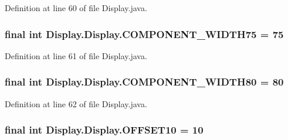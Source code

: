 Definition at line 60 of file Display.\+java.

\hypertarget{class_display_1_1_display_a357b313cc7372c3fce2808f738c26369}{}
\subsubsection[{C\+O\+M\+P\+O\+N\+E\+N\+T\+\_\+\+W\+I\+D\+T\+H75}]{\setlength{\rightskip}{0pt plus 5cm}final int Display.\+Display.\+C\+O\+M\+P\+O\+N\+E\+N\+T\+\_\+\+W\+I\+D\+T\+H75 = 75\hspace{0.3cm}{\ttfamily [static]}}\label{class_display_1_1_display_a357b313cc7372c3fce2808f738c26369}


Definition at line 61 of file Display.\+java.

\hypertarget{class_display_1_1_display_a42b05e8c9ef5a9a34a30dd19412e22e0}{}
\subsubsection[{C\+O\+M\+P\+O\+N\+E\+N\+T\+\_\+\+W\+I\+D\+T\+H80}]{\setlength{\rightskip}{0pt plus 5cm}final int Display.\+Display.\+C\+O\+M\+P\+O\+N\+E\+N\+T\+\_\+\+W\+I\+D\+T\+H80 = 80\hspace{0.3cm}{\ttfamily [static]}}\label{class_display_1_1_display_a42b05e8c9ef5a9a34a30dd19412e22e0}


Definition at line 62 of file Display.\+java.

\hypertarget{class_display_1_1_display_a43bf93ef0872de87948d181590683656}{}
\subsubsection[{O\+F\+F\+S\+E\+T10}]{\setlength{\rightskip}{0pt plus 5cm}final int Display.\+Display.\+O\+F\+F\+S\+E\+T10 = 10\hspace{0.3cm}{\ttfamily [static]}}\label{class_display_1_1_display_a43bf93ef0872de87948d181590683656}


